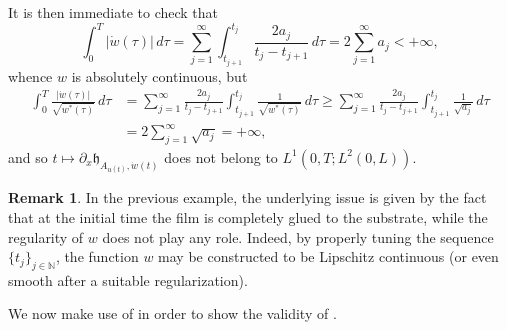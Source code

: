 \documentclass[a4paper,11pt,reqno]{amsart}
\numberwithin{equation}{section}
\theoremstyle{definition}
\newtheorem{remark}[teo]{Remark}
\theoremstyle{remark}
\newcommand{\n}{\mathbb{N}}
\begin{document}
    It is then immediate to check that
    \begin{equation}
        \int_0^T |\dot w(\tau)|\, d\tau=\sum_{j=1}^\infty  \int_{t_{j+1}}^{t_j} \frac{2 a_j}{t_j-t_{j+1}}\, d\tau=2\sum_{j=1}^\infty a_j<+\infty,
    \end{equation}
    whence $w$ is absolutely continuous, but
    \begin{align}
        \int_0^T \frac{|\dot w(\tau)|}{\sqrt{w^*(\tau)}} \, d\tau&=\sum_{j=1}^\infty \frac{2 a_j}{t_j-t_{j+1}} \int_{t_{j+1}}^{t_j}\frac{1}{\sqrt{w^*(\tau)}} \, d\tau\ge \sum_{j=1}^\infty \frac{2 a_j}{t_j-t_{j+1}} \int_{t_{j+1}}^{t_j}\frac{1}{\sqrt{a_j}} \, d\tau\\
        &=2\sum_{j=1}^\infty \sqrt{a_j}=+\infty,
    \end{align}
    and so $t\mapsto \partial_x \mathfrak{h}_{A_{u(t)},\dot w(t)}$ does not belong to $L^1(0,T;L^2(0,L))$.

    \begin{remark}
    In the previous example, the underlying issue is given by the fact that at the initial time the film is completely glued to the substrate, while the regularity of $w$ does not play any role. Indeed, by properly tuning the sequence $\{t_j\}_{j\in\n}$, the function $w$ may be constructed to be Lipschitz continuous (or even smooth after a suitable regularization).
    \end{remark}

    We now make use of  in order to show the validity of .
  
\end{document}
